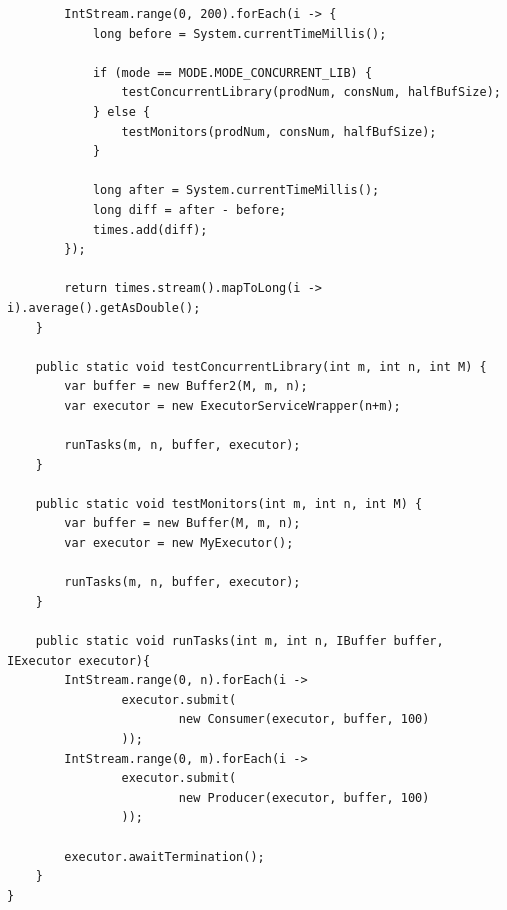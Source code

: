 \documentclass[12pt]{article}
\begin{document}
\begin{verbatim}
        IntStream.range(0, 200).forEach(i -> {
            long before = System.currentTimeMillis();

            if (mode == MODE.MODE_CONCURRENT_LIB) {
                testConcurrentLibrary(prodNum, consNum, halfBufSize);
            } else {
                testMonitors(prodNum, consNum, halfBufSize);
            }

            long after = System.currentTimeMillis();
            long diff = after - before;
            times.add(diff);
        });

        return times.stream().mapToLong(i -> i).average().getAsDouble();
    }

    public static void testConcurrentLibrary(int m, int n, int M) {
        var buffer = new Buffer2(M, m, n);
        var executor = new ExecutorServiceWrapper(n+m);

        runTasks(m, n, buffer, executor);
    }

    public static void testMonitors(int m, int n, int M) {
        var buffer = new Buffer(M, m, n);
        var executor = new MyExecutor();

        runTasks(m, n, buffer, executor);
    }

    public static void runTasks(int m, int n, IBuffer buffer, IExecutor executor){
        IntStream.range(0, n).forEach(i ->
                executor.submit(
                        new Consumer(executor, buffer, 100)
                ));
        IntStream.range(0, m).forEach(i ->
                executor.submit(
                        new Producer(executor, buffer, 100)
                ));

        executor.awaitTermination();
    }
}

\end{verbatim}
\end{document}
